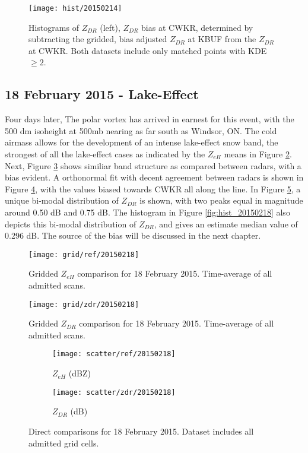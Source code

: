 \begin{figure}[p]
\texttt{[image: hist/20150214]}\centering
\caption{Histograms of $Z_{DR}$ (left), $Z_{DR}$ bias at CWKR, determined by subtracting the gridded, bias adjusted $Z_{DR}$ at KBUF from the $Z_{DR}$ at CWKR. Both datasets include only matched points with KDE $\geq 2$. } 
\label{fig:hist_20150214}
\end{figure}

\subsection{18 February 2015 - Lake-Effect}
Four days later, The polar vortex has arrived in earnest for this event, with the 500 dm isoheight at 500mb nearing as far south as Windsor, ON. The cold airmass allows for the development of an intense lake-effect snow band, the strongest of all the lake-effect cases as indicated by the $Z_{eH}$ means in Figure \ref{fig:grid_ref_20150218}. Next, Figure \ref{fig:grid_zdr_20150218} shows similiar band structure as compared between radars, with a bias evident. A orthonormal fit with decent agreement between radars is shown in Figure \ref{fig:scatter_ref_20150218}, with the values biased towards CWKR all along the line. In Figure \ref{fig:scatter_zdr_20150218}, a unique bi-modal distribution of $Z_{DR}$ is shown, with two peaks equal in magnitude around 0.50 dB and 0.75 dB. The histogram in Figure \ref{fig:hist_20150218} also depicts this bi-modal distribution of $Z_{DR}$, and gives an estimate median value of 0.296 dB. The source of the bias will be discussed in the next chapter. 
\begin{figure}[H]
\texttt{[image: grid/ref/20150218]}
\caption{Gridded $Z_{eH}$ comparison for 18 February 2015. Time-average of all admitted scans.} 
\label{fig:grid_ref_20150218}
\end{figure}

\begin{figure}[p]
\texttt{[image: grid/zdr/20150218]}
\caption{Gridded $Z_{DR}$ comparison for 18 February 2015. Time-average of all admitted scans.} 
\label{fig:grid_zdr_20150218}
\end{figure}

\begin{figure}[p]
\centering
   \begin{subfigure}{0.49\linewidth} \centering
     \texttt{[image: scatter/ref/20150218]}
     \caption{$Z_{eH}$ (dBZ)}\label{fig:scatter_ref_20150218}
   \end{subfigure}
   \begin{subfigure}{0.49\linewidth} \centering
     \texttt{[image: scatter/zdr/20150218]}
     \caption{$Z_{DR}$ (dB)}\label{fig:scatter_zdr_20150218}
   \end{subfigure}
\caption{Direct comparisons for 18 February 2015. Dataset includes all admitted grid cells.} \label{fig:scatter_20150218}
\end{figure}

